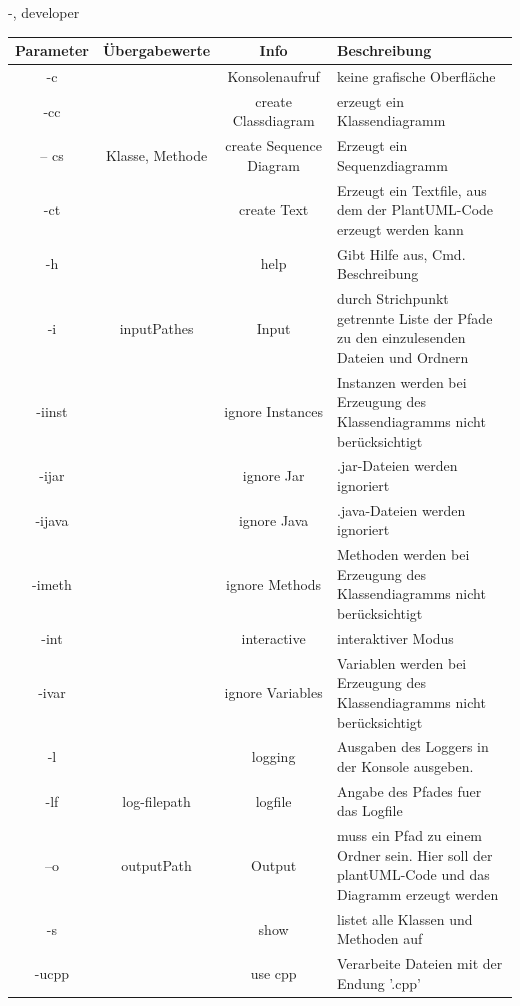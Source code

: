 \documentclass[twoside]{report}
\begin{document}
\begin{shownto}{-, developer}
\begin{tabular}{|c|c|c|p{5cm}|}
\hline 
Parameter & Übergabewerte & Info & Beschreibung \\ 
\hline 
-c & & Konsolenaufruf & keine grafische Oberfläche \\ 
\hline 
-cc & & create Classdiagram & erzeugt ein Klassendiagramm \\ 
\hline
-- cs & Klasse, Methode & create Sequence Diagram & Erzeugt ein Sequenzdiagramm\\
\hline
-ct &  & create Text & Erzeugt ein Textfile, aus dem der PlantUML-Code erzeugt werden kann \\ 
\hline
-h & & help & Gibt Hilfe aus, Cmd. Beschreibung\\
\hline 
-i & inputPathes & Input & durch Strichpunkt getrennte Liste der Pfade zu den einzulesenden Dateien und Ordnern \\ 
\hline
-iinst & & ignore Instances & Instanzen werden bei Erzeugung des Klassendiagramms nicht berücksichtigt\\
\hline 
-ijar & & ignore Jar & .jar-Dateien werden ignoriert \\ 
\hline 
-ijava & & ignore Java & .java-Dateien werden ignoriert \\ 
\hline 
-imeth & & ignore Methods &Methoden werden bei Erzeugung des Klassendiagramms nicht berücksichtigt \\
\hline
-int & & interactive & interaktiver Modus \\
\hline 
-ivar & & ignore Variables & Variablen werden bei Erzeugung des Klassendiagramms nicht berücksichtigt\\
\hline
-l & & logging & Ausgaben des Loggers in der Konsole ausgeben.\\
\hline
-lf & log-filepath & logfile  & Angabe des Pfades fuer das Logfile \\
\hline
--o & outputPath & Output & muss ein Pfad zu einem Ordner sein. Hier soll der plantUML-Code und das Diagramm erzeugt werden \\ 
\hline 
-s & & show & listet alle Klassen und Methoden auf \\
\hline
-ucpp &  & use cpp& Verarbeite Dateien mit der Endung '.cpp' \\
\hline 


\end{tabular} 
\nsecend %


\end{shownto}
\end{document}
